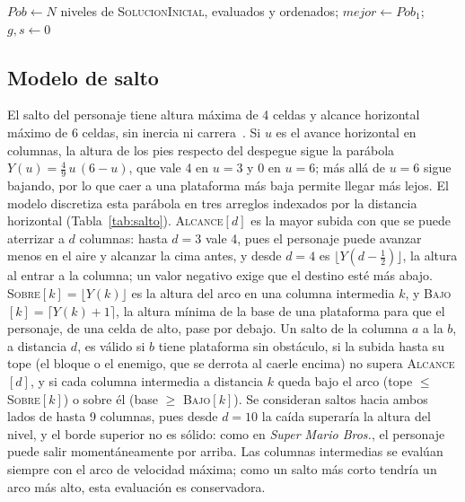 \documentclass[letter, 10pt]{article}
\begin{document}
\begin{algorithm}[!htb]
\footnotesize
{}
$Pob\leftarrow N$ niveles de \textsc{SolucionInicial}, evaluados y ordenados; $mejor\leftarrow Pob_1$; $g,s\leftarrow0$\;
\caption{Algoritmo evolutivo implementado.}\label{alg:ae}
\end{algorithm}

\subsection{Modelo de salto}\label{sec:salto}
El salto del personaje tiene altura m\'axima de 4 celdas y alcance horizontal m\'aximo de 6 celdas, sin inercia ni carrera~\cite{Saavedra2026}. Si $u$ es el avance horizontal en columnas, la altura de los pies respecto del despegue sigue la par\'abola $Y(u)=\tfrac{4}{9}\,u\,(6-u)$, que vale 4 en $u=3$ y 0 en $u=6$; m\'as all\'a de $u=6$ sigue bajando, por lo que caer a una plataforma m\'as baja permite llegar m\'as lejos. El modelo discretiza esta par\'abola en tres arreglos indexados por la distancia horizontal (Tabla~\ref{tab:salto}). \textsc{Alcance}$[d]$ es la mayor subida con que se puede aterrizar a $d$ columnas: hasta $d=3$ vale 4, pues el personaje puede avanzar menos en el aire y alcanzar la cima antes, y desde $d=4$ es $\lfloor Y(d-\tfrac12)\rfloor$, la altura al entrar a la columna; un valor negativo exige que el destino est\'e m\'as abajo. \textsc{Sobre}$[k]=\lfloor Y(k)\rfloor$ es la altura del arco en una columna intermedia $k$, y \textsc{Bajo}$[k]=\lceil Y(k)+1\rceil$, la altura m\'inima de la base de una plataforma para que el personaje, de una celda de alto, pase por debajo. Un salto de la columna $a$ a la $b$, a distancia $d$, es v\'alido si $b$ tiene plataforma sin obst\'aculo, si la subida hasta su tope (el bloque o el enemigo, que se derrota al caerle encima) no supera \textsc{Alcance}$[d]$, y si cada columna intermedia a distancia $k$ queda bajo el arco (tope $\le$ \textsc{Sobre}$[k]$) o sobre \'el (base $\ge$ \textsc{Bajo}$[k]$). Se consideran saltos hacia ambos lados de hasta 9 columnas, pues desde $d=10$ la ca\'ida superar\'ia la altura del nivel, y el borde superior no es s\'olido: como en \emph{Super Mario Bros.}, el personaje puede salir moment\'aneamente por arriba. Las columnas intermedias se eval\'uan siempre con el arco de velocidad m\'axima; como un salto m\'as corto tendr\'ia un arco m\'as alto, esta evaluaci\'on es conservadora.
\end{document}
